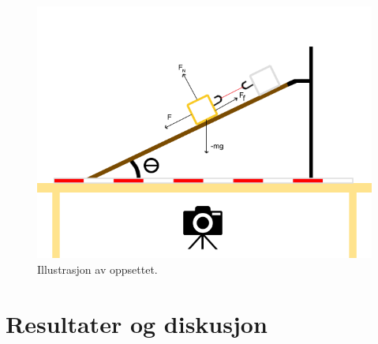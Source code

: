 \documentclass[10pt,a4paper]{report}
\begin{document}
\begin{figure}
\centerline{\includegraphics[scale=0.5]{withforces}}
\caption{Illustrasjon av oppsettet.}
\label{oppsett}
\end{figure}


{\let\clearpage\relax\chapter*{Resultater og diskusjon}}
\end{document}
